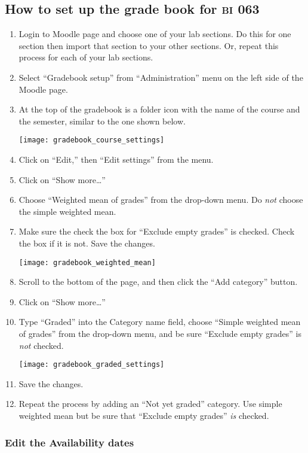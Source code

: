 \documentclass[12pt]{article}
\begin{document}
\subsection*{How to set up the grade book for {\scshape bi} 063}

\begin{enumerate}
	\item Login to Moodle page and choose one of your lab sections. Do this for one section then import that section 
	to your other sections. Or, repeat this process for each of your lab sections.
	
	\item Select “Gradebook setup” from ``Administration'' menu on the left side of the Moodle page.
	
	\item At the top of the gradebook is a folder icon with the name of the course and the semester, similar to the one shown below.

	{\centering
		\texttt{[image: gradebook\_course\_settings]}\par
	}

	\item Click on “Edit,” then “Edit settings” from the menu.
	
	\item Click on “Show more\dots”
	
	\item Choose “Weighted mean of grades” from the drop-down menu. Do \emph{not} choose the simple weighted mean.

	\item Make sure the check the box for “Exclude empty grades” is checked. Check the box if it is not.  Save the changes.
	
	{\centering
		\texttt{[image: gradebook\_weighted\_mean]}\par
	}

	\item Scroll to the bottom of the page, and then click the “Add category” button.
	
	\item Click on “Show more\dots”

	\item Type “Graded” into the Category name field, choose “Simple weighted mean of grades” from the drop-down menu, and be sure “Exclude empty grades” is \emph{not} checked.
	
	{\centering
		\texttt{[image: gradebook\_graded\_settings]}\par
	}
	
	\item Save the changes.
	
	\item Repeat the process by adding an “Not yet graded” category. Use simple weighted mean but be sure that “Exclude empty grades” \emph{is} checked. 
		
\end{enumerate}

\subsubsection*{Edit the Availability dates}
\end{document}
